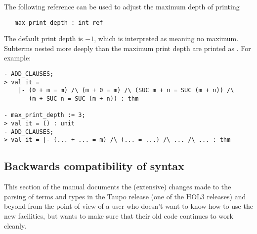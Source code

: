 {The following \ML{} reference can be used to adjust the maximum depth
of printing

\begin{boxed}
\begin{verbatim}
   max_print_depth : int ref
\end{verbatim}
\end{boxed}

\noindent The default print depth is $-1$, which is interpreted as
meaning no maximum.  Subterms nested more deeply than the maximum
print depth are printed as . For example:

\setcounter{sessioncount}{1}
\begin{session}
\begin{verbatim}
- ADD_CLAUSES;
> val it =
    |- (0 + m = m) /\ (m + 0 = m) /\ (SUC m + n = SUC (m + n)) /\
       (m + SUC n = SUC (m + n)) : thm

- max_print_depth := 3;
> val it = () : unit
- ADD_CLAUSES;
> val it = |- (... + ... = m) /\ (... = ...) /\ ... /\ ... : thm
\end{verbatim}
\end{session}

}

\subsection{Backwards compatibility of syntax}

This section of the manual documents the (extensive) changes made to
the parsing of \HOL{} terms and types in the Taupo release (one of the
HOL3 releases) and beyond from the point of view of a user who doesn't
want to know how to use the new facilities, but wants to make sure
that their old code continues to work cleanly.

